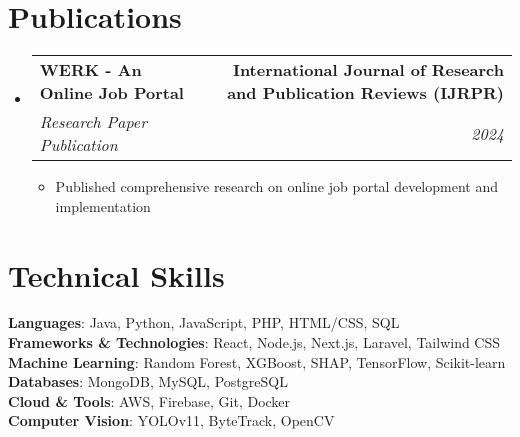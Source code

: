 \documentclass[letterpaper,11pt]{article}
\makeatletter
\newcommand{\resumeItem}[1]{
  \item\small{
    {#1 \vspace{-2pt}}
  }
}
\newcommand{\resumeSubheading}[4]{
  \vspace{-2pt}\item
    \begin{tabular*}{1.0\textwidth}[t]{l@{\extracolsep{\fill}}r}
      \textbf{#1} & \textbf{\small #2} \\
      \textit{\small#3} & \textit{\small #4} \\
    \end{tabular*}\vspace{-7pt}
}
\newcommand{\resumeSubHeadingListStart}{\begin{itemize}[leftmargin=0.0in, label={}]}
\newcommand{\resumeSubHeadingListEnd}{\end{itemize}}
\newcommand{\resumeItemListStart}{\begin{itemize}}
\newcommand{\resumeItemListEnd}{\end{itemize}\vspace{-5pt}}
\makeatother
\begin{document}
\section{Publications}
    \resumeSubHeadingListStart
      \resumeSubheading
        {WERK - An Online Job Portal}{International Journal of Research and Publication Reviews (IJRPR)}
        {Research Paper Publication}{2024}
        \resumeItemListStart
          \resumeItem{Published comprehensive research on online job portal development and implementation}
        \resumeItemListEnd
    \resumeSubHeadingListEnd

\section{Technical Skills}
 \begin{itemize}[leftmargin=0.15in, label={}]
    \small{\item{
     \textbf{Languages}{: Java, Python, JavaScript, PHP, HTML/CSS, SQL} \\
     \textbf{Frameworks \& Technologies}{: React, Node.js, Next.js, Laravel, Tailwind CSS} \\
     \textbf{Machine Learning}{: Random Forest, XGBoost, SHAP, TensorFlow, Scikit-learn} \\
     \textbf{Databases}{: MongoDB, MySQL, PostgreSQL} \\
     \textbf{Cloud \& Tools}{: AWS, Firebase, Git, Docker} \\
     \textbf{Computer Vision}{: YOLOv11, ByteTrack, OpenCV}
    }}
 \end{itemize}
 \vspace{-16pt}
\end{document}
